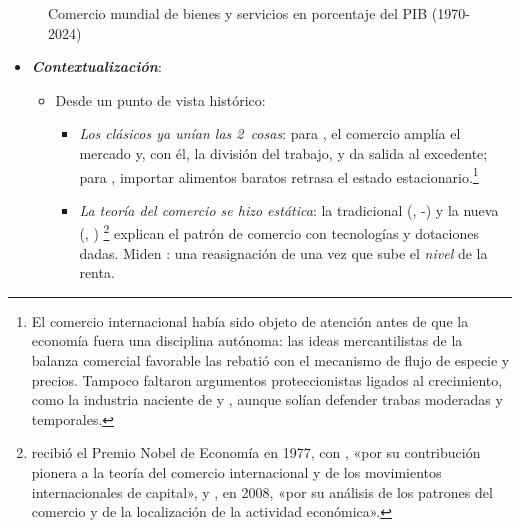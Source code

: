 \documentclass[11pt]{article}
\begin{document}
\begin{figure}[H]
\centering
\caption{Comercio mundial de bienes y servicios en porcentaje del PIB (1970-2024)}\label{fig:comercio-pib-mundial}
\end{figure}
\begin{itemize}
\item \textbf{\emph{Contextualización}}:
  \begin{itemize}
  \item Desde un punto de vista histórico:
    \begin{itemize}
    \item \emph{Los clásicos ya unían las 2~cosas}: para \textcite{Smith1776Wealth}, el comercio amplía el mercado y, con él, la división del trabajo, y da salida al excedente; para \textcite{Ricardo1817Principles}, importar alimentos baratos retrasa el estado estacionario.\footnote{El comercio internacional había sido objeto de atención antes de que la economía fuera una disciplina autónoma: las ideas mercantilistas de la balanza comercial favorable las rebatió \textcite{Hume1752Balance} con el mecanismo de flujo de especie y precios. Tampoco faltaron argumentos proteccionistas ligados al crecimiento, como la industria naciente de \textcite{Hamilton1791Report} y \textcite{List1841System} , aunque solían defender trabas moderadas y temporales.}
    \item \emph{La teoría del comercio se hizo estática}: la tradicional (, -)  y la nueva (, ) \footnote{ recibió el Premio Nobel de Economía en 1977, con , «por su contribución pionera a la teoría del comercio internacional y de los movimientos internacionales de capital»\nocite{Nobel1977MeadeOhlin}, y , en 2008, «por su análisis de los patrones del comercio y de la localización de la actividad económica»\nocite{Nobel2008Krugman}.} explican el patrón de comercio con tecnologías y dotaciones dadas. Miden : una reasignación de una vez que sube el \emph{nivel} de la renta.

\end{itemize}
\end{itemize}
\end{itemize}
\end{document}

